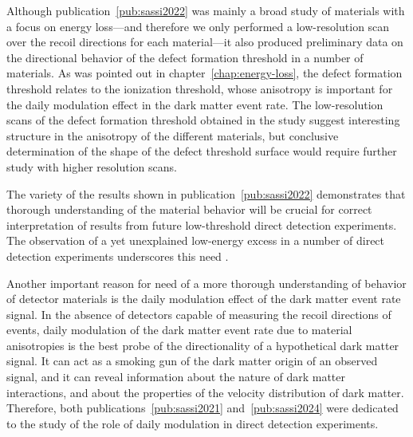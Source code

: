 \documentclass[b5paper, 10pt, twoside]{book}
\begin{document}
Although publication~\ref{pub:sassi2022} was mainly a broad study of materials with a focus on energy loss---and therefore we only performed a low-resolution scan over the recoil directions for each material---it also produced preliminary data on the directional behavior of the defect formation threshold in a number of materials. As was pointed out in chapter~\ref{chap:energy-loss}, the defect formation threshold relates to the ionization threshold, whose anisotropy is important for the daily modulation effect in the dark matter event rate. The low-resolution scans of the defect formation threshold obtained in the study suggest interesting structure in the anisotropy of the different materials, but conclusive determination of the shape of the defect threshold surface would require further study with higher resolution scans.

The variety of the results shown in publication~\ref{pub:sassi2022} demonstrates that thorough understanding of the material behavior will be crucial for correct interpretation of results from future low-threshold direct detection experiments. The observation of a yet unexplained low-energy excess in a number of direct detection experiments underscores this need \parencites{CRESSTIII2019, DAMIC2020, EDELWEISS2020, NUCLEUS2020, SENSEI2020, SuperCDMS2020}.

Another important reason for need of a more thorough understanding of behavior of detector materials is the daily modulation effect of the dark matter event rate signal. In the absence of detectors capable of measuring the recoil directions of events, daily modulation of the dark matter event rate due to material anisotropies is the best probe of the directionality of a hypothetical dark matter signal. It can act as a smoking gun of the dark matter origin of an observed signal, and it can reveal information about the nature of dark matter interactions, and about the properties of the velocity distribution of dark matter. Therefore, both publications~\ref{pub:sassi2021} and~\ref{pub:sassi2024} were dedicated to the study of the role of daily modulation in direct detection experiments.
\end{document}
